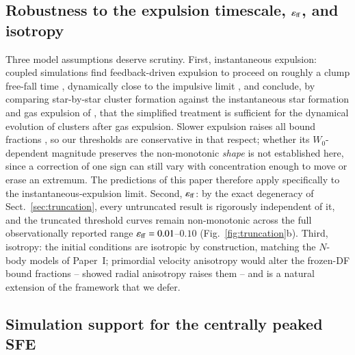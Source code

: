 \documentclass{aa}
\newcommand{\effE}{\varepsilon_{\rm ff}}
\begin{document}
\subsection{Robustness to the expulsion timescale, $\effE$, and
isotropy}
\label{sec:disc_robust}

Three model assumptions deserve scrutiny. First, instantaneous
expulsion: coupled simulations find feedback-driven expulsion to proceed
on roughly a clump free-fall time \citep{Li2019}, dynamically close to
the impulsive limit \citep{BaumgardtKroupa2007}, and
\citet{Fujii2021c} conclude, by comparing star-by-star cluster formation
against the instantaneous star formation and gas expulsion of
\citet{FujiiPZ2016}, that the simplified treatment is sufficient for the
dynamical evolution of clusters after gas expulsion. Slower expulsion
raises all bound fractions \citep{BaumgardtKroupa2007}, so our
thresholds are conservative in that respect; whether its $W_0$-dependent
magnitude preserves the non-monotonic \emph{shape} is not established
here, since a correction of one sign can still vary with concentration
enough to move or erase an extremum. The predictions of this paper
therefore apply specifically to the instantaneous-expulsion limit. Second, $\effE$: by the exact
degeneracy of Sect.~\ref{sec:truncation}, every untruncated result is
rigorously independent of it, and the truncated threshold curves remain
non-monotonic across the full observationally reported range
$\effE=0.01$--$0.10$ (Fig.~\ref{fig:truncation}b). Third, isotropy: the
initial conditions are isotropic by construction, matching the $N$-body
models of Paper~I; primordial velocity anisotropy would alter the
frozen-DF bound fractions -- \citet{Adams2000} showed radial anisotropy
raises them -- and is a natural extension of the framework that we
defer.

\subsection{Simulation support for the centrally peaked SFE}
\label{sec:disc_sim}
\end{document}
